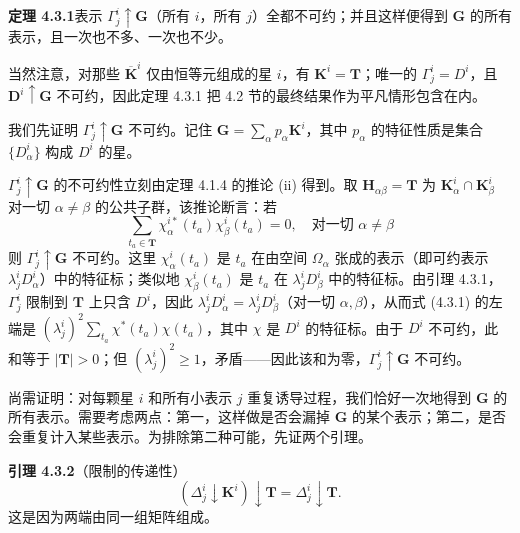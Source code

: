 \noindent\textbf{定理 4.3.1}\quad 表示 $\Gamma^{i}_{j} \uparrow \mathbf{G}$（所有 $i$，所有 $j$）全都不可约；并且这样便得到 $\mathbf{G}$ 的所有表示，且一次也不多、一次也不少。

当然注意，对那些 $\overline{\mathbf{K}}^{i}$ 仅由恒等元组成的星 $i$，有 $\mathbf{K}^{i} = \mathbf{T}$；唯一的 $\Gamma^{i}_{j} = D^{i}$，且 $\mathbf{D}^{i} \uparrow \mathbf{G}$ 不可约，因此定理 4.3.1 把 4.2 节的最终结果作为平凡情形包含在内。

我们先证明 $\Gamma^{i}_{j} \uparrow \mathbf{G}$ 不可约。记住 $\mathbf{G} = \sum_{\alpha}p_{\alpha}\mathbf{K}^{i}$，其中 $p_{\alpha}$ 的特征性质是集合 $\{D^{i}_{\alpha}\}$ 构成 $D^{i}$ 的星。

$\Gamma^{i}_{j} \uparrow \mathbf{G}$ 的不可约性立刻由定理 4.1.4 的推论 (ii) 得到。取 $\mathbf{H}_{\alpha\beta} = \mathbf{T}$ 为 $\mathbf{K}^{i}_{\alpha} \cap \mathbf{K}^{i}_{\beta}$ 对一切 $\alpha \neq \beta$ 的公共子群，该推论断言：若
\begin{equation*}
\sum_{t_{a} \in \mathbf{T}}\chi^{i*}_{\alpha}(t_{a})\chi^{i}_{\beta}(t_{a}) = 0, \quad\text{对一切 } \alpha \neq \beta
\tag{4.3.1}
\end{equation*}
则 $\Gamma^{i}_{j} \uparrow \mathbf{G}$ 不可约。这里 $\chi^{i}_{\alpha}(t_{a})$ 是 $t_{a}$ 在由空间 $\Omega_{\alpha}$ 张成的表示（即可约表示 $\lambda^{i}_{j}D^{i}_{\alpha}$）中的特征标；类似地 $\chi^{i}_{\beta}(t_{a})$ 是 $t_{a}$ 在 $\lambda^{i}_{j}D^{i}_{\beta}$ 中的特征标。由引理 4.3.1，$\Gamma^{i}_{j}$ 限制到 $\mathbf{T}$ 上只含 $D^{i}$，因此 $\lambda^{i}_{j}D^{i}_{\alpha} = \lambda^{i}_{j}D^{i}_{\beta}$（对一切 $\alpha, \beta$），从而式 (4.3.1) 的左端是 $\left(\lambda^{i}_{j}\right)^{2}\sum_{t_{a}}\chi^{*}(t_{a})\chi(t_{a})$，其中 $\chi$ 是 $D^{i}$ 的特征标。由于 $D^{i}$ 不可约，此和等于 $|\mathbf{T}| > 0$；但 $\left(\lambda^{i}_{j}\right)^{2} \geq 1$，矛盾——因此该和为零，$\Gamma^{i}_{j} \uparrow \mathbf{G}$ 不可约。

尚需证明：对每颗星 $i$ 和所有小表示 $j$ 重复诱导过程，我们恰好一次地得到 $\mathbf{G}$ 的所有表示。需要考虑两点：第一，这样做是否会漏掉 $\mathbf{G}$ 的某个表示；第二，是否会重复计入某些表示。为排除第二种可能，先证两个引理。

\noindent\textbf{引理 4.3.2}\quad （限制的传递性）
\begin{equation*}
\left(\Delta^{i}_{j} \downarrow \mathbf{K}^{i}\right) \downarrow \mathbf{T} = \Delta^{i}_{j} \downarrow \mathbf{T}.
\tag{4.3.2}
\end{equation*}
这是因为两端由同一组矩阵组成。


